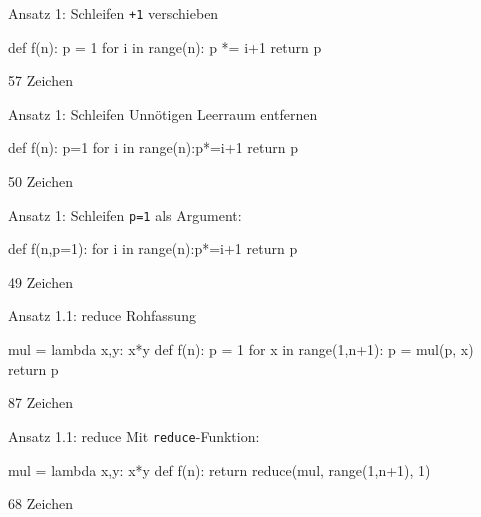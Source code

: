 \documentclass[xcolor=dvipsnames, aspectratio=43, 14pt]{beamer}
\begin{document}
\begin{frame}[fragile]{Ansatz 1: Schleifen}
	\texttt{+1} verschieben\strut
	
	\vfill
	
	\begin{python3code}
	def f(n):
	   p = 1
	   for i in range(n):
	      p *= i+1
	   return p
	\end{python3code}
	
	\vfill
	
	57 Zeichen
\end{frame}

\begin{frame}[fragile]{Ansatz 1: Schleifen}
	Unnötigen Leerraum entfernen
	
	\vfill
	
	\begin{python3code}
	def f(n):
	   p=1
	   for i in range(n):p*=i+1
	   return p
	\end{python3code}
	
	\vfill
	
	50 Zeichen
\end{frame}

\begin{frame}[fragile]{Ansatz 1: Schleifen}
	\texttt{p=1} als Argument:
	
	\vfill
	
	\begin{python3code}
	def f(n,p=1):
	   for i in range(n):p*=i+1
	   return p
	\end{python3code}
	
	\vfill
	
	49 Zeichen
\end{frame}

\begin{frame}[fragile]{Ansatz 1.1: reduce}
	Rohfassung
	
	\vfill
	
	\begin{python3code}
	mul = lambda x,y: x*y
	def f(n):
	   p = 1
	   for x in range(1,n+1):
	      p = mul(p, x)
	   return p
	\end{python3code}
	
	\vfill
	
	87 Zeichen
\end{frame}

\begin{frame}[fragile]{Ansatz 1.1: reduce}
	Mit \texttt{reduce}-Funktion:
	
	\vfill
	
	\begin{python3code}
	mul = lambda x,y: x*y
	def f(n):
	   return reduce(mul, range(1,n+1), 1)
	\end{python3code}
	
	\vfill
	
	68 Zeichen
\end{frame}
\end{document}

